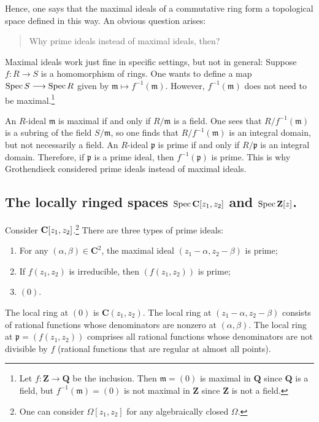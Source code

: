 \documentclass [11 pt, oneside] {article}
\begin{document}
Hence, one says that the maximal ideals of a commutative ring form a topological space defined in this way. An obvious question arises:
\begin{quote}
	\small 
	Why prime ideals instead of maximal ideals, then?
\end{quote}
Maximal ideals work just fine in specific settings, but not in general: Suppose $f:R\longrightarrow S$ is a homomorphism of rings. One wants to define a map $\operatorname{Spec} S \longrightarrow \operatorname{Spec} R$ given by $\mathfrak{m} \longmapsto f^{-1}(\mathfrak{m})$. However, $f^{-1}(\mathfrak{m})$ does not need to be maximal.\footnote{Let $f:\mathbf{Z} \longrightarrow \mathbf{Q}$ be the inclusion. Then $\mathfrak{m}=(0)$ is maximal in $\mathbf{Q}$ since $\mathbf{Q}$ is a field, but $f^{-1}(\mathfrak{m}) = (0)$ is not maximal in $\mathbf{Z}$ since $\mathbf{Z}$ is not a field.}

An $R$-ideal $\mathfrak{m}$ is maximal if and only if $R/\mathfrak{m}$ is a field. One sees that $R/f^{-1}(\mathfrak{m})$ is a subring of the field $S/\mathfrak{m}$, so one finds that $R/f^{-1}(\mathfrak{m})$ is an integral domain, but not necessarily a field. An $R$-ideal $\mathfrak{p}$ is prime if and only if $R/\mathfrak{p}$ is an integral domain. Therefore, if $\mathfrak{p}$ is a prime ideal, then $f^{-1}(\mathfrak{p})$ is prime. This is why Grothendieck considered prime ideals instead of maximal ideals.

\subsection{The locally ringed spaces \texorpdfstring{$\operatorname{Spec} \mathbf C[z_1,z_2]$}{Spec C[z1,z2]} and \texorpdfstring{$\operatorname{Spec} \mathbf Z[z]$}{Spec Z[z]}.}
Consider $\mathbf C[z_1,z_2]$.\footnote{One can consider $\Omega[z_1,z_2]$ for any algebraically closed $\Omega$.} There are three types of prime ideals:
\begin{enumerate}
	\item For any $(\alpha,\beta)\in  \mathbf{C}^2$, the maximal ideal $(z_1-\alpha,z_2-\beta)$ is prime;
	\item If $f(z_1,z_2)$ is irreducible, then $(f(z_1,z_2))$ is prime; 
	\item $(0)$.
\end{enumerate}
The local ring at $(0)$ is $\mathbf{C}(z_1,z_2)$. The local ring at $(z_1-\alpha, z_2-\beta)$ consists of rational functions whose denominators are nonzero at $(\alpha,\beta)$. The local ring at $\mathfrak{p} = (f(z_1,z_2))$ comprises all rational functions whose denominators are not divisible by $f$ (rational functions that are regular at almost all points).
\end{document}
